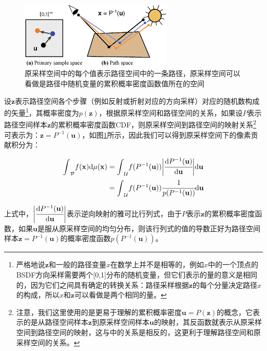 \begin{figure}
	\sidecaption
	\includegraphics[width=0.65\textwidth]{figures/mlt/primary-space}
	\caption{原采样空间中的每个值表示路径空间中的一条路径，原采样空间可以看做是路径中随机变量的累积概率密度函数值所在的空间}
	\label{f:mlt-primary-space}
\end{figure}

设$\mathbf{z}$表示路径空间各个步骤（例如反射或折射对应的方向采样）对应的随机数构成的矢量\footnote{严格地说$\mathbf{z}$和一般的路径变量${x}$在数学上并不是相等的，例如${x}$中的一个顶点的BSDF方向采样需要两个[0,1]分布的随机变量，但它们表示的量的意义是相同的，因为它们之间具有确定的转换关系：路径采样根据$\mathbf{z}$的每个分量决定路径${x}$的构成，所以${x}$和$\mathbf{z}$可以看做是两个相同的量。}，其概率密度为$p(\mathbf{z})$，根据原采样空间和路径空间的关系，如果设$P$表示路径空间样本$\mathbf{z}$的累积概率密度函数CDF，则原采样空间到路径空间的映射关系\footnote{注意，我们这里使用的是更易于理解的累积概率密度$\mathbf{u}=P(\mathbf{z})$的概念，它表示的是从路径空间样本$\mathbf{z}$到原采样空间样本$\mathbf{u}$的映射，其反函数就表示从原采样空间到路径空间的映射，这与\cite{a:ASimpleandRobustMutationStrategyfortheMetropolisLightTransportAlgorithm}中的关系是相反的，这更利于理解路径空间和原采样空间的关系。}可表示为：$\mathbf{z}=P^{-1}(\mathbf{u})$，如图\ref{f:mlt-primary-space}所示，因此我们可以得到原采样空间下的像素贡献积分为：

\begin{equation}\label{e:mlt-pssmlt-mapping}
\begin{aligned}
	{\rm \int}_{\mathcal{P}}f({\mathbf{x}}){\rm d}\mu({\mathbf{x}})&={\rm \int}_{\mathcal{U}}f(P^{-1}(\mathbf{u}))\bigg| \cfrac{{\rm d}P^{-1}(\mathbf{u})}{{\rm d}\mathbf{u}}\bigg|{\rm d}\mathbf{u}\\
	&={\rm \int}_{\mathcal{U}}f(P^{-1}(\mathbf{u})) \cfrac{1}{p(P^{-1}(\mathbf{u}))}{\rm d}\mathbf{u}
\end{aligned}
\end{equation}

\noindent 上式中，$\bigg| \cfrac{{\rm d}P^{-1}(\mathbf{u})}{{\rm d}\mathbf{u}}\bigg|$表示逆向映射的雅可比行列式，由于$P$表示$\mathbf{z}$的累积概率密度函数，如果$\mathbf{u}$是服从原采样空间的均匀分布，则该行列式的值的导数正好为路径空间样本$\mathbf{z}=P^{-1}(\mathbf{u})$的概率密度函数$p(P^{-1}(\mathbf{u}))$。

